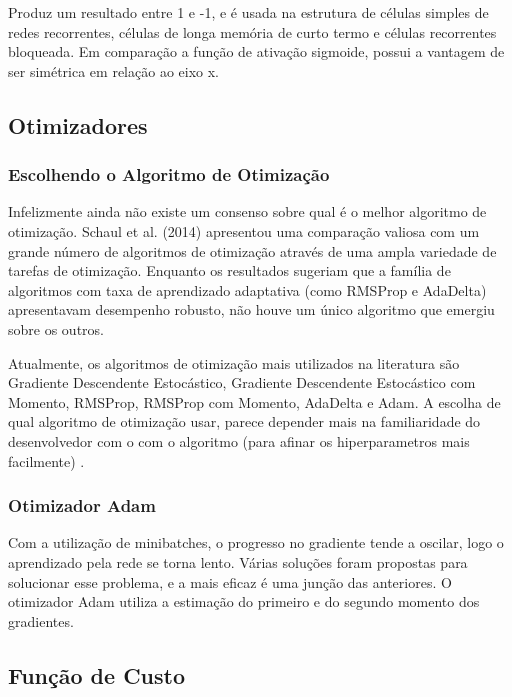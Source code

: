 \documentclass[12pt]{article}
\begin{document}
Produz um resultado entre 1 e -1, e é usada na estrutura de células simples de redes recorrentes, células de longa memória de curto termo e células recorrentes bloqueada. Em comparação a função de ativação sigmoide, possui a vantagem de ser simétrica em relação ao eixo x.

\subsection{Otimizadores}

\subsubsection{Escolhendo o Algoritmo de Otimização}

Infelizmente ainda não existe um consenso sobre qual é o melhor algoritmo de otimização. Schaul et al. (2014) apresentou uma comparação valiosa com um grande número de algoritmos de otimização através de uma ampla variedade de tarefas de otimização. Enquanto os resultados sugeriam que a família de algoritmos com taxa de aprendizado adaptativa (como RMSProp e AdaDelta) apresentavam desempenho robusto, não houve um único algoritmo que emergiu sobre os outros.

Atualmente, os algoritmos de otimização mais utilizados na literatura são Gradiente Descendente Estocástico, Gradiente Descendente Estocástico com Momento, RMSProp, RMSProp com Momento, AdaDelta e Adam. A escolha de qual algoritmo de otimização usar, parece depender mais na familiaridade do desenvolvedor com o com o algoritmo (para afinar os hiperparametros mais facilmente) \cite{Goodfellow-et-al-2016}.

\subsubsection{Otimizador Adam}

Com a utilização de minibatches, o progresso no gradiente tende a oscilar, logo o aprendizado pela rede se torna lento. Várias soluções foram propostas para solucionar esse problema, e a mais eficaz é uma junção das anteriores. O otimizador Adam \cite{DBLP:journals/corr/KingmaB14} utiliza a estimação do primeiro e do segundo momento dos gradientes.

\subsection{Função de Custo}
\end{document}
